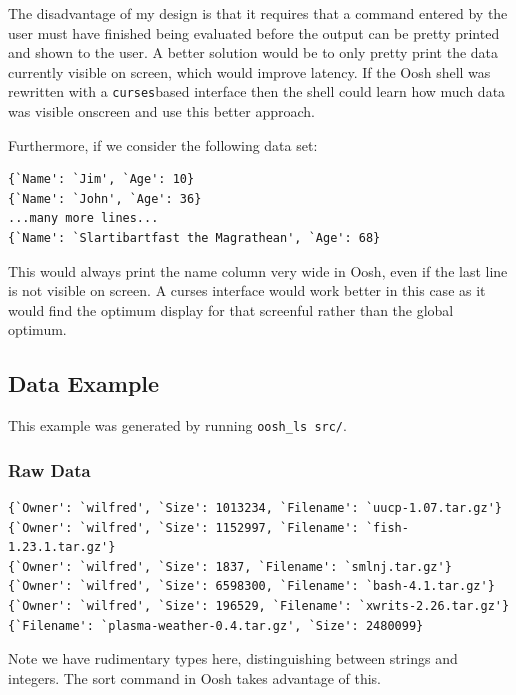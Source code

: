 \documentclass[12pt,twoside,notitlepage]{report}
\begin{document}
The disadvantage of my design is that it requires that a command
entered by the user must have finished being evaluated before the
output can be pretty printed and shown to the user. A better solution
would be to only pretty print the data currently visible on screen,
which would improve latency. If the Oosh shell was rewritten with a
{\tt curses}\footnotemark[1] based interface then the shell could learn how
much data was visible onscreen and use this better approach.

Furthermore, if we consider the following data set:


\begin{verbatim}
{`Name': `Jim', `Age': 10}
{`Name': `John', `Age': 36}
...many more lines...
{`Name': `Slartibartfast the Magrathean', `Age': 68}
\end{verbatim}

This would always print the name column very wide in Oosh, even if the last
line is not visible on screen. A curses interface would work better in
this case as it would find the optimum display for that screenful
rather than the global optimum.



\subsection{Data Example}

This example was generated by running {\tt oosh\_ls src/}.

\subsubsection{Raw Data}
\label{rawdata}
\begin{verbatim}
{`Owner': `wilfred', `Size': 1013234, `Filename': `uucp-1.07.tar.gz'}
{`Owner': `wilfred', `Size': 1152997, `Filename': `fish-1.23.1.tar.gz'}
{`Owner': `wilfred', `Size': 1837, `Filename': `smlnj.tar.gz'}
{`Owner': `wilfred', `Size': 6598300, `Filename': `bash-4.1.tar.gz'}
{`Owner': `wilfred', `Size': 196529, `Filename': `xwrits-2.26.tar.gz'}
{`Filename': `plasma-weather-0.4.tar.gz', `Size': 2480099}
\end{verbatim}
Note we have rudimentary types here, distinguishing between strings and
integers. The sort command in Oosh takes advantage of this.
\end{document}
